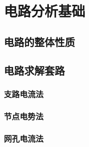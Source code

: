 

\section{电路分析基础}\label{17-3}

\subsection{电路的整体性质}\label{17-3-1}

\subsection{电路求解套路}\label{17-3-2}

\subsubsection{支路电流法}\label{17-3-2-1}

\subsubsection{节点电势法}\label{17-3-2-2}

\subsubsection{网孔电流法}\label{17-3-2-3}